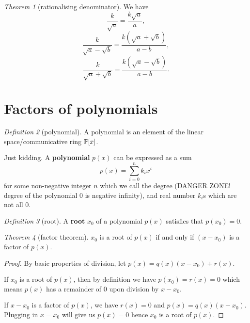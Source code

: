 \documentclass[8pt]{article}
\theoremstyle{remark}
\newtheorem{theorem}{Theorem}[section]
\newtheorem{definition}[theorem]{Definition}
\begin{document}
        \begin{theorem}[rationalising denominator]
            We have
            $$
                \frac{k}{\sqrt{a}} = \frac{k \sqrt{a}}{a},
            $$
            $$
                \frac{k}{\sqrt{a} - \sqrt{b}} = \frac{k(\sqrt{a} + \sqrt{b})}{a - b},
            $$
            $$
                \frac{k}{\sqrt{a} + \sqrt{b}} = \frac{k(\sqrt{a} - \sqrt{b})}{a - b}.
            $$
        \end{theorem}

    \section{Factors of polynomials}
        \begin{definition}[polynomial]
            A polynomial is an element of the linear space/communicative ring $\mathbb{P} [x]$.

            Just kidding. A \textbf{polynomial} $p(x)$ can be expressed as a sum
            $$
                p(x) = \sum_{i = 0}^{n} k_i x^i
            $$
            for some non-negative integer $n$ which we call the degree (DANGER ZONE! degree of the polynomial 0 is negative infinity), and real number $k_i$s which are not all 0. 
        \end{definition}

        \begin{definition}[root]
            A \textbf{root} $x_0$ of a polynomial $p(x)$ satisfies that $p(x_0) = 0$.
        \end{definition}

        \begin{theorem}[factor theorem]
            $x_0$ is a root of $p(x)$ if and only if $(x - x_0)$ is a factor of $p(x)$.

            \begin{proof}
                By basic properties of division, let $p(x) = q(x) (x - x_0) + r(x)$.

                If $x_0$ is a root of $p(x)$, then by definition we have $p(x_0) = r(x) = 0$ which means $p(x)$ has a remainder of $0$ upon division by $x - x_0$.
                
                If $x - x_0$ is a factor of $p(x)$, we have $r(x) = 0$ and $p(x) = q(x) (x - x_0)$. Plugging in $x = x_0$ will give us $p(x) = 0$ hence $x_0$ is a root of $p(x)$.
            \end{proof}
        \end{theorem}
\end{document}
